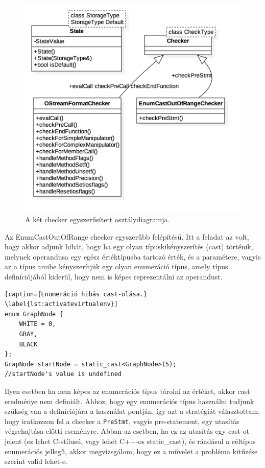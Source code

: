 \documentclass[a4paper,12pt]{report}
\begin{document}
\begin{figure}[h]
\caption{A két checker egyszerűsített osztálydiagramja.}
\centering
\includegraphics[scale=0.4]{checkers.png}
\end{figure}

Az EnumCastOutOfRange checker egyszerűbb felépítésű. Itt a feladat az volt, hogy akkor adjunk hibát, hogy ha egy olyan típuskikényszerítés (cast) történik, melynek operandusa egy egész értéktípusba tartozó érték, és a paramétere, vagyis az a típus amibe kényszerítjük egy olyan enumeráció típus, amely típus definíciójából kiderül, hogy nem is képes reprezentálni az operandust.

\begin{lstlisting}[caption={Enumeráció hibás cast-olása.}
\label{lst:activatevirtualenv}]
enum GraphNode {
	WHITE = 0,
	GRAY,
	BLACK
};
GrapNode startNode = static_cast<GraphNode>(5);
//startNode's value is undefined
\end{lstlisting}

Ilyen esetben ha nem képes az enumerációs típus tárolni az értéket, akkor cast eredménye nem definiált. Ahhoz, hogy egy enumerációs típus használni tudjunk szükség van a definíciójára a használat pontján, így azt a stratégiát választottam, hogy iratkozzon fel a checker a \texttt{PreStmt}, vagyis pre-statement, egy utasítás végrehajtása előtti eseményre. Abban az esetben, ha ez az utasítás egy cast-ot jelent (ez lehet C-stílusú, vagy lehet C++-os static\_cast), és ráadásul a céltípus enumerációs jellegű, akkor megvizsgálom,  hogy ez a művelet a probléma kitűzése szerint valid lehet-e.
\end{document}
